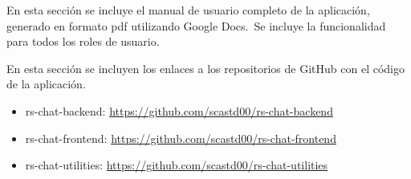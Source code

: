\label{anx:gantt}




En esta sección se incluye el manual de usuario completo de la aplicación, generado en formato pdf utilizando
Google Docs.\ Se incluye la funcionalidad para todos los roles de usuario.





En esta sección se incluyen los enlaces a los repositorios de GitHub con el código de la aplicación.

\begin{itemize}
	\item rs-chat-backend:
	\href{https://github.com/scastd00/rs-chat-backend}{https://github.com/scastd00/rs-chat-backend}
	\item rs-chat-frontend:
	\href{https://github.com/scastd00/rs-chat-frontend}{https://github.com/scastd00/rs-chat-frontend}
	\item rs-chat-utilities:
	\href{https://github.com/scastd00/rs-chat-utilities}{https://github.com/scastd00/rs-chat-utilities}
\end{itemize}
